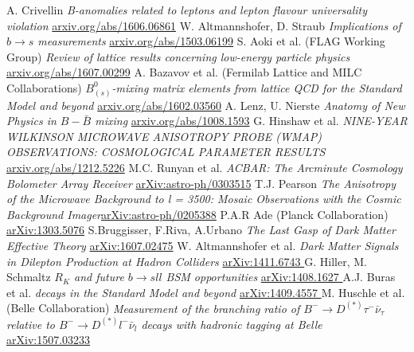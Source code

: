 \begin{thebibliography}{xxx}
 A. Crivellin \textit{B-anomalies related to leptons and lepton flavour universality violation} \href{https://arxiv.org/abs/1606.06861}{arxiv.org/abs/1606.06861}
 W. Altmannshofer, D. Straub \textit{Implications of $b\rightarrow s$ measurements} \href{https://arxiv.org/abs/1503.06199}{arxiv.org/abs/1503.06199}
 S. Aoki et al. (FLAG Working Group) \textit{Review of lattice results concerning low-energy particle physics} \href{https://arxiv.org/abs/1607.00299}{arxiv.org/abs/1607.00299}
 A. Bazavov et al. (Fermilab Lattice and MILC Collaborations) \textit{$B^0_{(s)}$-mixing matrix elements from lattice QCD for the Standard Model and beyond} \href{https://arxiv.org/abs/1602.03560}{arxiv.org/abs/1602.03560}
 A. Lenz, U. Nierste \textit{Anatomy of New Physics in $B-\bar B$ mixing} \href{https://arxiv.org/abs/1008.1593}{arxiv.org/abs/1008.1593}
 G. Hinshaw et al. \textit{NINE-YEAR WILKINSON MICROWAVE ANISOTROPY PROBE (WMAP) OBSERVATIONS: COSMOLOGICAL PARAMETER RESULTS}  \href{https://arxiv.org/abs/1212.5226}{arxiv.org/abs/1212.5226}
 M.C. Runyan et al. \textit{ACBAR: The Arcminute Cosmology Bolometer Array Receiver} \href{https://arxiv.org/abs/astro-ph/0303515}{arXiv:astro-ph/0303515}
 T.J. Pearson \textit{The Anisotropy of the Microwave Background to l = 3500: Mosaic Observations with the Cosmic Background Imager}\href{https://arxiv.org/abs/astro-ph/0205388}{arXiv:astro-ph/0205388}
 P.A.R Ade (Planck Collaboration) \href{https://arxiv.org/abs/1303.5076}{arXiv:1303.5076}
 S.Bruggisser, F.Riva, A.Urbano \textit{The Last Gasp of Dark Matter Effective Theory} \href{https://arxiv.org/abs/1607.02475}{arXiv:1607.02475}
 W. Altmannshofer et al. \textit{Dark Matter Signals in Dilepton Production at Hadron Colliders} \href{https://arxiv.org/abs/1411.6743}{arXiv:1411.6743 }
 G. Hiller, M. Schmaltz \textit{$R_K$ and future $b\rightarrow sll$ BSM opportunities} \href{https://arxiv.org/abs/1408.1627}{arXiv:1408.1627 }
 A.J. Buras et al. \textit{decays in the Standard Model and beyond} \href{https://arxiv.org/abs/1409.4557}{arXiv:1409.4557 }
 M. Huschle et al. (Belle Collaboration) \textit{Measurement of the branching ratio of $B^-\rightarrow D^{(*)}\tau^-\bar \nu_\tau$ relative to $B^-\rightarrow D^{(*)}l^-\bar \nu_l$ decays with hadronic tagging at Belle} \href{https://arxiv.org/abs/1507.03233}{arXiv:1507.03233}

\end{thebibliography}
